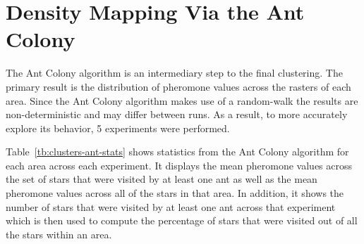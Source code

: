 \newpage
\section{\label{sec:results-ant}Density Mapping Via the Ant Colony}
The Ant Colony algorithm is an intermediary step to the final clustering. The primary result is the distribution of pheromone values across the rasters of each area. Since the Ant Colony algorithm makes use of a random-walk the results are non-deterministic and may differ between runs. As a result, to more accurately explore its behavior, 5 experiments were performed.

Table~\ref{tb:clusters-ant-stats} shows statistics from the Ant Colony algorithm for each area across each experiment. It displays the mean pheromone values across the set of stars that were visited by at least one ant as well as the mean pheromone values across all of the stars in that area. In addition, it shows the number of stars that were visited by at least one ant across that experiment which is then used to compute the percentage of stars that were visited out of all the stars within an area.

